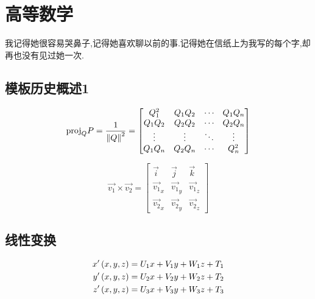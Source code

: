 \chapter{高等数学}
\begin{center}
    \textcolor[RGB]{255, 0, 0}{\faHeart}我记得她很容易哭鼻子,记得她喜欢聊以前的事.记得她在信纸上为我写的每个字,却再也没有见过她一次.\textcolor[RGB]{255, 0, 0}{\faHeart}
\end{center}
\vspace{-5pt}
\begin{center}
\end{center}

\section{模板历史概述1}
\[
    \mathrm{proj}_QP=\frac{1}{\left\| Q \right\|^2}=
    \begin{bmatrix}
        Q_1^2  & Q_1Q_2 & \cdots & Q_1Q_n \\
        Q_1Q_2 & Q_2Q_2 & \cdots & Q_2Q_n \\
        \vdots & \vdots & \ddots & \vdots \\
        Q_1Q_n & Q_2Q_n & \cdots & Q_n^2  \\
    \end{bmatrix}
\]

\[
    \overrightarrow{v_1} \times \overrightarrow{v_2} = \begin{bmatrix}
        \vec{i}                & \vec{j}                & \vec{k}                \\
        \overrightarrow{v_1}_x & \overrightarrow{v_1}_y & \overrightarrow{v_1}_z \\
        \overrightarrow{v_2}_x & \overrightarrow{v_2}_y & \overrightarrow{v_2}_z
    \end{bmatrix}
\]

\section{线性变换}

\begin{align*}
    x'\left(x,y,z\right) & = U_1x+V_1y+W_1z+T_1 \\
    y'\left(x,y,z\right) & = U_2x+V_2y+W_2z+T_2 \\
    z'\left(x,y,z\right) & = U_3x+V_3y+W_3z+T_3
\end{align*}

